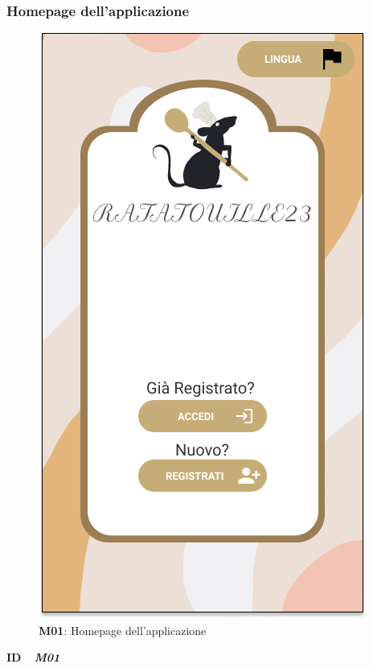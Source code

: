     \subsubsection{Homepage dell'applicazione}
        \begin{figure}[H]
          \centering
          \includegraphics[scale=0.5]{assets/diagrammi/Mockup/Mockup_Homepage.png}
          \caption{\textbf{M01}: Homepage dell'applicazione}
          \label{fig:Mockup_Homepage}
        \end{figure}

        \newpage

        \begin{flushleft}
            \textbf{ID} \ \Large{ \emph{\textbf{M01}}}\\
        \end{flushleft}

